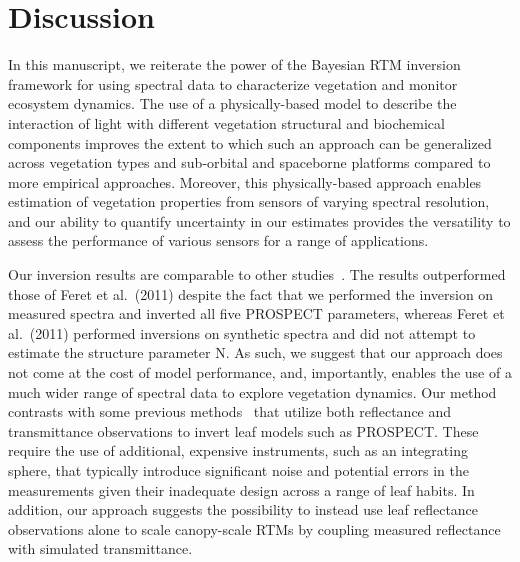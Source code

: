 \section{Discussion}\label{sec:pecanrtm-discussion}

In this manuscript, we reiterate the power of the Bayesian RTM inversion framework for using spectral data to characterize vegetation and monitor ecosystem dynamics.
The use of a physically-based model to describe the interaction of light with different vegetation structural and biochemical components improves the extent to which such an approach can be generalized across vegetation types and sub-orbital and spaceborne platforms compared to more empirical approaches.
Moreover, this physically-based approach enables estimation of vegetation properties from sensors of varying spectral resolution, and our ability to quantify uncertainty in our estimates provides the versatility to assess the performance of various sensors for a range of applications. 

Our inversion results are comparable to other studies~\cite{feret_2008_prospect,feret_2011_optimizing,li_2011_retrieval,divittorio_2009_enhancing}.
The results outperformed those of Feret et al.~(2011) despite the fact that we performed the inversion on measured spectra and inverted all five PROSPECT parameters,
whereas Feret et al.~(2011) performed inversions on synthetic spectra and did not attempt to estimate the structure parameter N. \nocite{feret_2011_optimizing}
As such, we suggest that our approach does not come at the cost of model performance, and, importantly, enables the use of a much wider range of spectral data to explore vegetation dynamics.
Our method contrasts with some previous methods~\cite[e.g., ][]{feret_2008_prospect,feret_2011_optimizing} that utilize both reflectance and transmittance observations to invert leaf models such as PROSPECT\@.
These require the use of additional, expensive instruments, such as an integrating sphere, that typically introduce significant noise and potential errors in the measurements given their inadequate design across a range of leaf habits.
In addition, our approach suggests the possibility to instead use leaf reflectance observations alone to scale canopy-scale RTMs by coupling measured reflectance with simulated transmittance.

